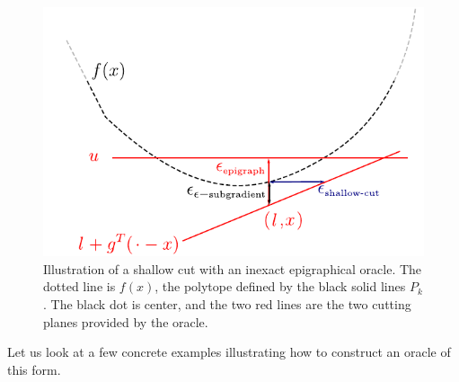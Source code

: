 \begin{figure} 
\begin{centering}
\includegraphics[scale=1.1]{cutting/fig0.pdf}
\par\end{centering}
\caption{Illustration of a shallow cut with an inexact epigraphical oracle. The dotted
line is $f(x)$, the polytope defined by the black solid lines $P_k$. The black
dot is center, and the two red lines are the two cutting planes provided by the 
oracle.} \label{fig:approx-oracle}
\end{figure}

Let us look at a few concrete examples illustrating how to construct an oracle of this form.

